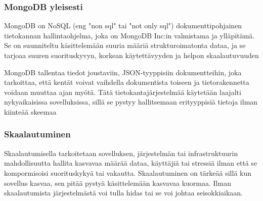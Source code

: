 







\subsubsection{MongoDB yleisesti}









MongoDB on NoSQL (eng "non sql"{} tai "not only sql"{}) dokumenttipohjainen tietokannan hallintaohjelma,
joka on MongoDB Inc:in valmistama ja ylläpitämä.
Se on suunniteltu käsittelemään suuria määriä strukturoimatonta dataa,
ja se tarjoaa suuren suorituskyvyn, korkean käytettävyyden ja helpon skaalautuvuuden
\medskip




MongoDB tallentaa tiedot joustaviin, JSON-tyyppisiin dokumentteihin, 
joka tarkoittaa, että kentät voivat vaihdella dokumentista toiseen ja tietorakennetta voidaan muuttaa ajan myötä. 
Tätä tietokantajärjestelmää käytetään laajalti nykyaikaisissa sovelluksissa, 
sillä se pystyy hallitsemaan erityyppisiä tietoja ilman kiinteää skeemaa
\medskip








\subsubsection{Skaalautuminen}




Skaalautumisella tarkoitetaan sovelluksen, järjestelmän tai infrastruktuurin
mahdollisuutta hallita kasvavaa määrää dataa, käyttäjiä tai stressiä ilman että se kompormisoisi suorituskykyä tai vakautta.
Skaalautuminen on tärkeää sillä kun sovellus kasvaa, sen pitää pystyä käsittelemään kasvavaa kuormaa.
Ilman skaalautumista järjestelmästä voi tulla hidas tai se voi johtaa seisokkiaikaan.
\medskip

